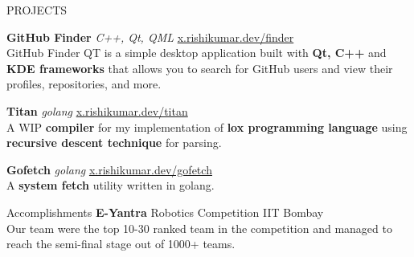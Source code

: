 \documentclass{resume} %
\begin{document}
	\begin{rSection}{PROJECTS}
		\vspace{-1.25em}
		\item \textbf{GitHub Finder} \textit{C++, Qt, QML} \hfill {\href{x.rishikumar.dev/finder}{x.rishikumar.dev/finder}}\\
			{GitHub Finder QT is a simple desktop application built with \textbf{Qt, C++} and \textbf{KDE frameworks} that allows you to search for GitHub users and view their profiles, repositories, and more.} 
		\item \textbf{Titan} \textit{golang} \hfill {\href{x.rishikumar.dev/titan}{x.rishikumar.dev/titan}}\\
			{A WIP \textbf{compiler} for my implementation of \textbf{lox programming language} using \textbf{recursive descent technique}  for parsing.}
		\item \textbf{Gofetch} \textit{golang} \hfill {\href{x.rishikumar.dev/gofetch}{x.rishikumar.dev/gofetch}}\\
			{A \textbf{system fetch} utility written in golang.}
	\end{rSection} 


	
	\begin{rSection}{Accomplishments} 
		\textbf{E-Yantra} {Robotics Competition} \hfill IIT Bombay\\
		{Our team were the top 10-30 ranked team in the competition and managed to reach the semi-final stage out of 1000+ teams.} 	
	\end{rSection}
\end{document}
